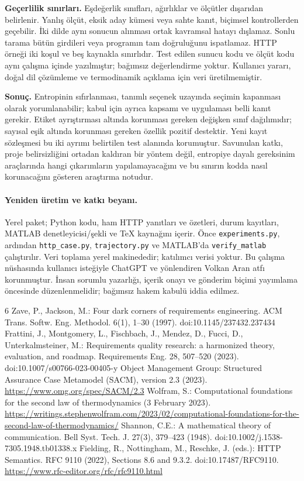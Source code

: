 \documentclass[runningheads]{llncs}
\begin{document}
\textbf{Geçerlilik sınırları.} Eşdeğerlik sınıfları, ağırlıklar ve ölçütler dışarıdan belirlenir. Yanlış ölçüt, eksik aday kümesi veya sahte kanıt, biçimsel kontrollerden geçebilir. İki dilde aynı sonucun alınması ortak kavramsal hatayı dışlamaz. Sonlu tarama bütün girdileri veya programın tam doğruluğunu ispatlamaz. HTTP örneği iki koşul ve beş kaynakla sınırlıdır. Test edilen sunucu kodu ve ölçüt kodu aynı çalışma içinde yazılmıştır; bağımsız değerlendirme yoktur. Kullanıcı yararı, doğal dil çözümleme ve termodinamik açıklama için veri üretilmemiştir.

\textbf{Sonuç.} Entropinin sıfırlanması, tanımlı seçenek uzayında seçimin kapanması olarak yorumlanabilir; kabul için ayrıca kapsamı ve uygulaması belli kanıt gerekir. Etiket ayrıştırması altında korunması gereken değişken sınıf dağılımıdır; sayısal eşik altında korunması gereken özellik pozitif destektir. Yeni kayıt sözleşmesi bu iki ayrımı belirtilen test alanında korumuştur. Savunulan katkı, proje belirsizliğini ortadan kaldıran bir yöntem değil, entropiye dayalı gereksinim araçlarında hangi çıkarımların yapılamayacağını ve bu sınırın kodda nasıl korunacağını gösteren araştırma notudur.

\paragraph{Yeniden üretim ve katkı beyanı.}
Yerel paket; Python kodu, ham HTTP yanıtları ve özetleri, durum kayıtları, MATLAB denetleyicisi/şekli ve TeX kaynağını içerir. Önce \texttt{experiments.py}, ardından \texttt{http\_case.py}, \texttt{trajectory.py} ve MATLAB'da \texttt{verify\_matlab} çalıştırılır. Veri toplama yerel makinededir; katılımcı verisi yoktur. Bu çalışma nüshasında kullanıcı isteğiyle ChatGPT ve yönlendiren Volkan Aran atfı korunmuştur. İnsan sorumlu yazarlığı, içerik onayı ve gönderim biçimi yayımlama öncesinde düzenlenmelidir; bağımsız hakem kabulü iddia edilmez.

\begin{thebibliography}{6}
 Zave, P., Jackson, M.: Four dark corners of requirements engineering. ACM Trans. Softw. Eng. Methodol. 6(1), 1--30 (1997). doi:10.1145/237432.237434
 Frattini, J., Montgomery, L., Fischbach, J., Mendez, D., Fucci, D., Unterkalmsteiner, M.: Requirements quality research: a harmonized theory, evaluation, and roadmap. Requirements Eng. 28, 507--520 (2023). doi:10.1007/s00766-023-00405-y
 Object Management Group: Structured Assurance Case Metamodel (SACM), version 2.3 (2023). \url{https://www.omg.org/spec/SACM/2.3}
 Wolfram, S.: Computational foundations for the second law of thermodynamics (3 February 2023). \url{https://writings.stephenwolfram.com/2023/02/computational-foundations-for-the-second-law-of-thermodynamics/}
 Shannon, C.E.: A mathematical theory of communication. Bell Syst. Tech. J. 27(3), 379--423 (1948). doi:10.1002/j.1538-7305.1948.tb01338.x
 Fielding, R., Nottingham, M., Reschke, J. (eds.): HTTP Semantics. RFC 9110 (2022), Sections 8.6 and 9.3.2. doi:10.17487/RFC9110. \url{https://www.rfc-editor.org/rfc/rfc9110.html}
\end{thebibliography}
\end{document}
